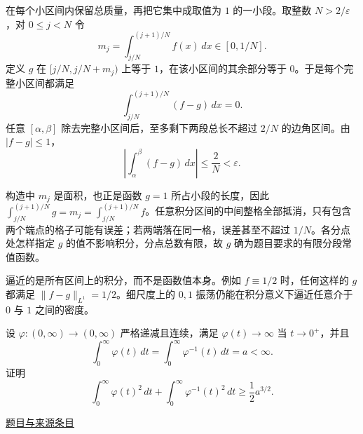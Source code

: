 \documentclass[12pt,fontset=fandol]{ctexart}
\begin{document}
\begin{solve}\label{ans:pre02-math:7}

在每个小区间内保留总质量，再把它集中成取值为 $1$ 的一小段。取整数 $N>2/\varepsilon$，对 $0\le j<N$ 令
\[
m_j=\int_{j/N}^{(j+1)/N}f(x)\,dx\in[0,1/N].
\]
定义 $g$ 在 $[j/N,j/N+m_j)$ 上等于 $1$，在该小区间的其余部分等于 $0$。于是每个完整小区间都满足
\[
\int_{j/N}^{(j+1)/N}(f-g)\,dx=0.
\]
任意 $[\alpha,\beta]$ 除去完整小区间后，至多剩下两段总长不超过 $2/N$ 的边角区间。由 $|f-g|\le1$，
\[
\left|\int_\alpha^\beta(f-g)\,dx\right|\le\frac2N<\varepsilon.
\]

构造中 $m_j$ 是面积，也正是函数 $g=1$ 所占小段的长度，因此 $\int_{j/N}^{(j+1)/N}g=m_j=\int_{j/N}^{(j+1)/N}f$。任意积分区间的中间整格全部抵消，只有包含两个端点的格子可能有误差；若两端落在同一格，误差甚至不超过 $1/N$。各分点处怎样指定 $g$ 的值不影响积分，分点总数有限，故 $g$ 确为题目要求的有限分段常值函数。

\end{solve}

\begin{remark}[方法与条件]逼近的是所有区间上的积分，而不是函数值本身。例如 $f\equiv1/2$ 时，任何这样的 $g$ 都满足 $\|f-g\|_{L^1}=1/2$。细尺度上的 $0,1$ 振荡仍能在积分意义下逼近任意介于 $0$ 与 $1$ 之间的密度。\end{remark}

\begin{example}[来源序号8]\label{ex:pre02-math:8}\label{pr:pre02-math:8}

设 $\varphi:(0,\infty)\to(0,\infty)$ 严格递减且连续，满足 $\varphi(t)\to\infty$ 当 $t\to0^+$，并且
\[
\int_0^\infty\varphi(t)\,dt
=\int_0^\infty\varphi^{-1}(t)\,dt=a<\infty.
\]
证明
\[
\int_0^\infty\varphi(t)^2\,dt
+\int_0^\infty\varphi^{-1}(t)^2\,dt
\ge\frac12a^{3/2}.
\]

\par\href{https://github.com/lzxcr/cmc-mathematics/blob/64916fa1fdbc3e444a652eca204d5669058ee321/src/problems/preliminary/02/08.md}{题目与来源条目}

\end{example}
\end{document}

